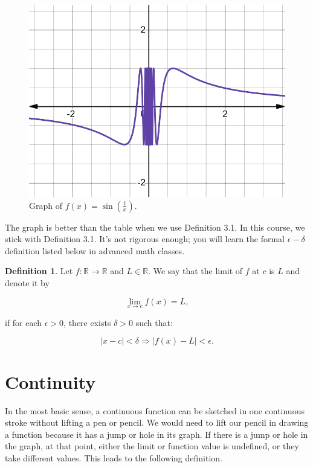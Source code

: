 \documentclass[
]{book}
\theoremstyle{definition}
\newtheorem{definition}{Definition}[chapter]
\theoremstyle{definition}
\theoremstyle{definition}
\theoremstyle{definition}
\theoremstyle{remark}
\begin{document}
\begin{figure}
\centering
\includegraphics{fig/fig11.png}
\caption{Graph of \(f(x) =\sin\left(\frac{1}{x}\right)\).}
\end{figure}

The graph is better than the table when we use Definition 3.1. In this
course, we stick with Definition 3.1. It's not rigorous enough; you will learn the formal \(\epsilon - \delta\) definition listed below in advanced math classes.

\begin{definition}
\protect\hypertarget{def:unnamed-chunk-16}{}\label{def:unnamed-chunk-16}Let \(f: \mathbb{R} \to \mathbb{R}\) and
\(L \in \mathbb{R}\). We say that the limit of \(f\) at \(c\) is \(L\) and
denote it by

\[\lim_{{x \to c}} f(x) = L,\]

if for each \(\epsilon > 0\), there exists \(\delta > 0\) such that:

\[|x - c| < \delta \Rightarrow |f(x) - L| < \epsilon.\]
\end{definition}

\section{Continuity}\label{continuity}

In the most basic sense, a continuous function can be sketched in one
continuous stroke without lifting a pen or pencil. We would need to lift our pencil in drawing a function because it has a jump or hole in its graph. If there is a jump or hole in the graph, at that point, either the limit or function value is undefined, or they take different values. This leads to the following definition.
\end{document}

